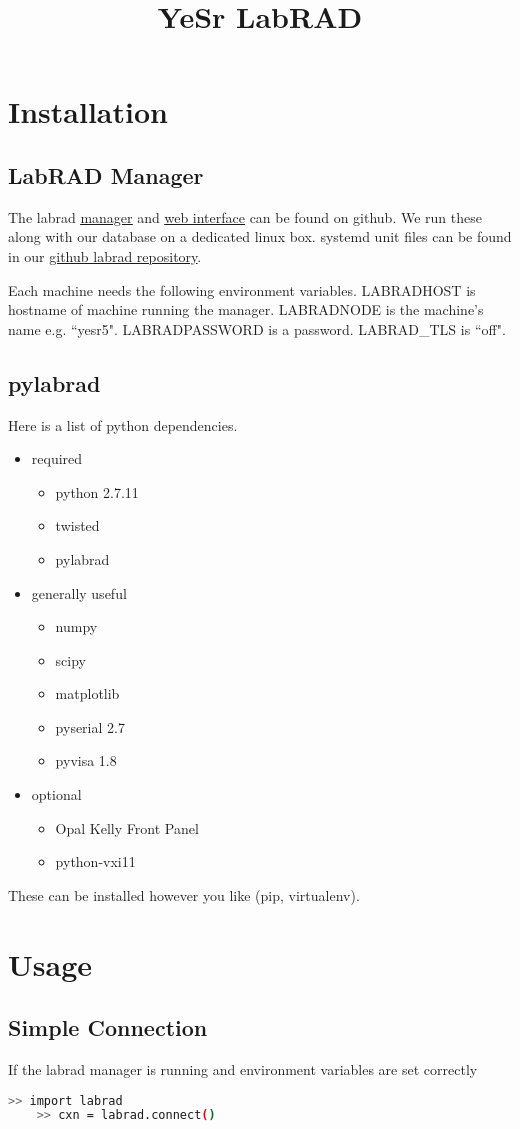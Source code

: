 
\usepackage{listings}
\title{YeSr LabRAD}

\maketitle

\section{Installation}
\subsection{LabRAD Manager}
The labrad \href{https://github.com/labrad/scalabrad}{\underline{manager}} and \href{https://github.com/labrad/scalabrad-web}{\underline{web interface}} can be found on github. We run these along with our database on a dedicated linux box. systemd unit files can be found in our \href{https://github.com/yesrgang/labrad}{\underline{github labrad repository}}.

Each machine needs the following environment variables. LABRADHOST is hostname of machine running the manager. LABRADNODE is the machine's name e.g. ``yesr5". LABRADPASSWORD is a password. LABRAD\_TLS is ``off".

\subsection{pylabrad}
Here is a list of python dependencies. 
\begin{itemize}
    \item required
    \begin{itemize}
        \item python 2.7.11
        \item twisted
        \item pylabrad
    \end{itemize}
    \item generally useful
    \begin{itemize}
        \item numpy 
        \item scipy
        \item matplotlib
        \item pyserial 2.7
        \item pyvisa 1.8
    \end{itemize}
    \item optional
    \begin{itemize}
        \item Opal Kelly Front Panel
        \item python-vxi11
    \end{itemize}
\end{itemize}
These can be installed however you like (pip, virtualenv).

\section{Usage}
\subsection{Simple Connection}
If the labrad manager is running and environment variables are set correctly
\begin{lstlisting}[language=bash]
    >> import labrad
    >> cxn = labrad.connect()
\end{lstlisting}



